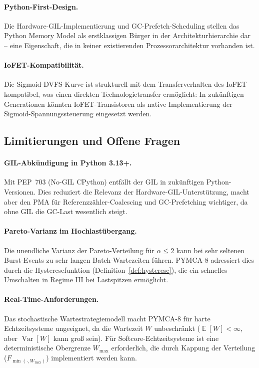 ﻿\documentclass[a4paper,12pt]{scrreprt}
\theoremstyle{definition}
\DeclareMathOperator{\E}{\mathbb{E}}
\DeclareMathOperator{\Var}{Var}
\begin{document}
	\paragraph{Python-First-Design.}
	Die Hardware-GIL-Implementierung und GC-Prefetch-Scheduling stellen
	das Python Memory Model als erstklassigen Bürger in der
	Architekturhierarchie dar -- eine Eigenschaft, die in keiner existierenden
	Prozessorarchitektur vorhanden ist.
	
	\paragraph{IoFET-Kompatibilität.}
	Die Sigmoid-DVFS-Kurve ist strukturell mit dem Transferverhalten des
	IoFET \cite{epp2026iono} kompatibel, was einen direkten Technologietransfer
	ermöglicht: In zukünftigen Generationen könnten IoFET-Transistoren
	als native Implementierung der Sigmoid-Spannungssteuerung eingesetzt
	werden.
	
	\subsection{Limitierungen und Offene Fragen}
	
	\paragraph{GIL-Abkündigung in Python 3.13+.}
	Mit PEP~703 (No-GIL CPython) \cite{python_pep703} entfällt der GIL
	in zukünftigen Python-Versionen. Dies reduziert die Relevanz der
	Hardware-GIL-Unterstützung, macht aber den PMA für
	Referenzzähler-Coalescing und GC-Prefetching wichtiger, da ohne GIL
	die GC-Last wesentlich steigt.
	
	\paragraph{Pareto-Varianz im Hochlastübergang.}
	Die unendliche Varianz der Pareto-Verteilung für $\alpha \le 2$
	kann bei sehr seltenen Burst-Events zu sehr langen Batch-Wartezeiten
	führen. PYMCA-8 adressiert dies durch die Hysteresefunktion
	(Definition~\ref{def:hysterese}), die ein schnelles Umschalten
	in Regime III bei Lastspitzen ermöglicht.
	
	\paragraph{Real-Time-Anforderungen.}
	Das stochastische Wartestrategiemodell macht PYMCA-8 für harte
	Echtzeitsysteme ungeeignet, da die Wartezeit $W$ unbeschränkt
	($\E[W] < \infty$, aber $\Var[W]$ kann groß sein). Für
	Softcore-Echtzeitsysteme ist eine deterministische Obergrenze
	$W_{\max}$ erforderlich, die durch Kappung der Verteilung
	($F_{\min(\cdot, W_{\max})}$) implementiert werden kann.
	
\end{document}
